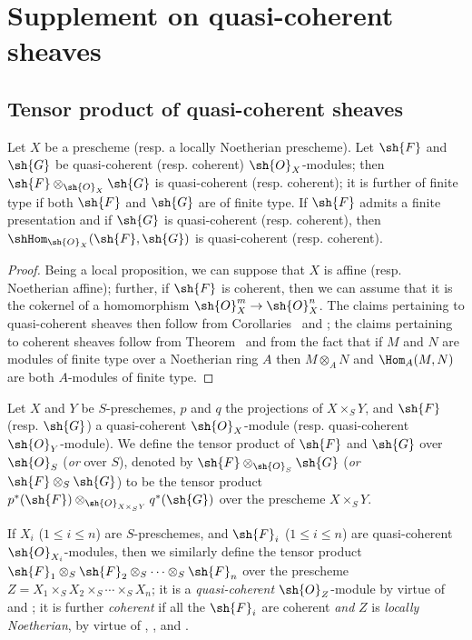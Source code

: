 \section{Supplement on quasi-coherent sheaves}
\label{section:I.9}

\subsection{Tensor product of quasi-coherent sheaves}
\label{subsection:I.9.1}

\begin{proposition}[9.1.1]
\label{I.9.1.1}
Let $X$ be a prescheme (resp. a locally Noetherian prescheme). Let $\sh{F}$ and
$\sh{G}$ be quasi-coherent (resp. coherent) $\sh{O}_X$-modules; then
$\sh{F}\otimes_{\sh{O}_X}\sh{G}$ is quasi-coherent (resp. coherent); it is further
of finite type if both $\sh{F}$ and $\sh{G}$ are of finite type. If
$\sh{F}$ admits a finite presentation and if $\sh{G}$ is quasi-coherent
(resp. coherent), then $\shHom_{\sh{O}_X}(\sh{F},\sh{G})$ is quasi-coherent
(resp. coherent).
\end{proposition}

\begin{proof}
Being a local proposition, we can suppose that $X$ is affine (resp. Noetherian
affine); further, if $\sh{F}$ is coherent, then we can assume that it is the
cokernel of a homomorphism $\sh{O}_X^m\to\sh{O}_X^n$. The claims pertaining to
quasi-coherent sheaves then follow from Corollaries~ and ; the
claims pertaining to coherent sheaves follow from Theorem~ and from the fact
that if $M$ and $N$ are modules of finite type over a Noetherian ring $A$
then $M\otimes_A N$ and $\Hom_A(M,N)$ are both $A$-modules of finite type.
\end{proof}

\begin{definition}[9.1.2]
\label{I.9.1.2}
Let $X$ and $Y$ be $S$-preschemes, $p$ and
$q$ the projections of $X\times_S Y$, and $\sh{F}$ (resp. $\sh{G}$) a
quasi-coherent $\sh{O}_X$-module (resp. quasi-coherent $\sh{O}_Y$-module). We define the
tensor product of $\sh{F}$ and $\sh{G}$ over $\sh{O}_S$ (\emph{or} over $S$),
denoted by $\sh{F}\otimes_{\sh{O}_S}\sh{G}$
(\emph{or} $\sh{F}\otimes_S\sh{G}$) to be the tensor product
$p^*(\sh{F})\otimes_{\sh{O}_{X\times_S Y}}q^*(\sh{G})$ over the prescheme $X\times_S Y$.
\end{definition}

If $X_i$ ($1\leq i\leq n$) are $S$-preschemes, and $\sh{F}_i$ ($1\leq i\leq n$) are quasi-coherent
$\sh{O}_{X_i}$-modules, then we similarly define the tensor product
$\sh{F}_1\otimes_S\sh{F}_2\otimes_S\cdots\otimes_S\sh{F}_n$ over the
prescheme $Z=X_1\times_S X_2\times_S\cdots\times_S X_n$; it is a
\emph{quasi-coherent} $\sh{O}_Z$-module by virtue of  and
; it is further \emph{coherent} if all the $\sh{F}_i$ are coherent \emph{and}
$Z$ is \emph{locally Noetherian}, by virtue of ,
, and .

